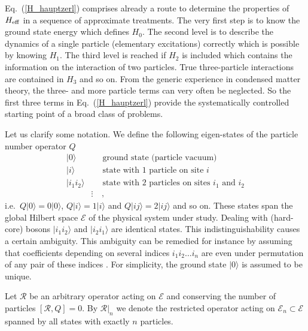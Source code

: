 Eq.~(\ref{H_hauptzerl}) comprises already a route to determine
the properties of $H_{\rm eff}$ in a sequence of approximate
treatments. The very first step is to know the ground state
energy which defines $H_0$. The second level is to describe
the dynamics of a single particle (elementary excitations) correctly
which is possible by knowing $H_1$. The third level is reached
if $H_2$ is included which contains the information on the 
interaction of two particles. True three-particle interactions
are contained in $H_3$ and so on. From the generic experience
in condensed matter theory, the three- and more particle terms
can very often be neglected. So the first three terms in 
Eq.~(\ref{H_hauptzerl})
provide the systematically controlled starting point of a broad class
of problems.

Let us clarify some notation. We define the
following eigen-states of the particle number operator $Q$
\begin{eqnarray}
  \nonumber
  |0\rangle && \mbox{ ground state (particle vacuum)}\\\nonumber
  |i\rangle && \mbox{ state with 1 particle on site } i\\\nonumber
  |i_1i_2\rangle && \mbox{ state with 2 particles on sites }i_1\mbox{ and
    }i_2\\
\label{states} 
   & \vdots & \ ,
\end{eqnarray}
i.e.\ $Q|0\rangle=0|0\rangle$, $Q|i\rangle=1|i\rangle$ and
$Q|ij\rangle=2|ij\rangle$ and so on. These states 
span the global Hilbert space ${\mathcal E}$ of the physical system
under study. Dealing with (hard-core) bosons $|i_1i_2\rangle$
and $|i_2i_1\rangle$ are identical states. This indistinguishability
causes a certain ambiguity. This ambiguity can be remedied for instance 
by assuming that coefficients depending on several indices $i_1i_2\ldots i_n$ are even
under permutation of any pair of these indices \cite{fnote}.
 For simplicity, the  ground state $|0\rangle$ is assumed to be unique.

Let ${\mathcal R}$ be an arbitrary operator  acting on ${\mathcal
  E}$ and conserving the number of particles $[{\mathcal R},Q]=0$.  
By ${\mathcal R}|_n$ we denote the  restricted operator
acting on ${\mathcal E}_n \subset{\mathcal E}$ spanned by all
  states with exactly $n$  particles.


